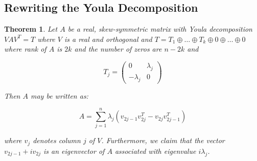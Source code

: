 \documentclass[a4,11pt,twoside,leqno]{report}
\newtheorem{thm}{Theorem}[section]
\theoremstyle{definition}
\theoremstyle{remark}
\numberwithin{equation}{section}
\begin{document}
\subsection{Rewriting the Youla Decomposition}

\begin{thm} Let $A$ be a real, skew-symmetric matrix with Youla decomposition $VAV^T=T$ where $V$ is a real and orthogonal and $T=T_1 \oplus \dots \oplus T_k \oplus 0\oplus \dots \oplus 0$  where rank of $A$ is $2k$ and the number of zeros are $n-2k$ and 

$$T_j=\begin{pmatrix} 0 & \lambda_j \\ -\lambda_j & 0 \end{pmatrix}$$

Then $A$ may be written as:

$$A=\displaystyle \sum_{j=1}^n \lambda_j(v_{2j-1}v_{2j}^T-v_{2j}v_{2j-1}^T)$$

where $v_j$ denotes column $j$ of $V$. Furthermore, we claim that the vector $v_{2j-1} + iv_{2j}$ is an eigenvector of $A$ associated with eigenvalue $i\lambda_j$. 
 
\end{thm}
\end{document}
